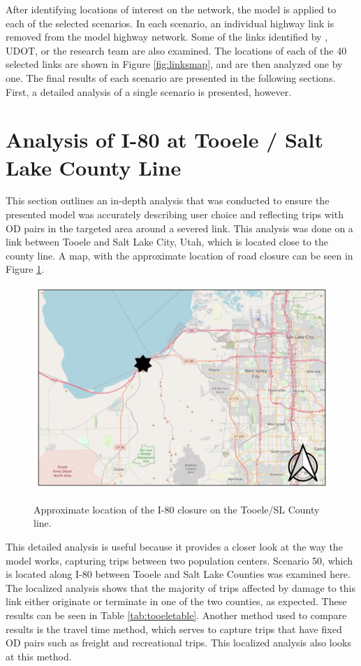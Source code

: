 After identifying locations of interest on the network, the model is applied to
each of the selected scenarios. In each scenario, an individual highway
link is removed from the model highway network. Some of the links identified
by \citeauthor{aem2017}, UDOT, or the research team are
also examined. The locations of each of the 40
selected links are shown in Figure \ref{fig:linksmap}, and are then analyzed one by one. The
final results of each scenario are presented in the following sections. First, a detailed analysis of a single
scenario is presented, however.

\section{Analysis of I-80 at Tooele / Salt Lake County Line}

This section outlines an in-depth analysis that was conducted to ensure
the presented model was accurately describing user choice and reflecting trips with OD pairs in the
targeted area around a severed link. This analysis was done on a link between
Tooele and Salt Lake City, Utah, which is located close to the county line. A map, with the approximate
location of road closure can be seen in Figure \ref{fig:tooelemapwithcone}.

\begin{figure}
  \centering
{\centering \includegraphics[width=0.85\linewidth]{figures/chapter4/tooelemapwithcone.png}
}
\caption{Approximate location of the I-80 closure on the Tooele/SL County line.}\label{fig:tooelemapwithcone}
\end{figure}

This detailed analysis is useful because it
provides a closer look at the way the model works, capturing trips
between two population centers. Scenario 50, which is located along I-80 between Tooele and Salt Lake Counties
was examined here. The localized analysis shows that the majority of trips
affected by damage to this link either originate or terminate in one of the
two counties, as expected. These results can be seen in Table
\ref{tab:tooeletable}. Another method used to compare results is
the travel time method,
which serves to capture trips that have fixed OD pairs such as freight and
recreational trips. This localized analysis also looks at this method.


